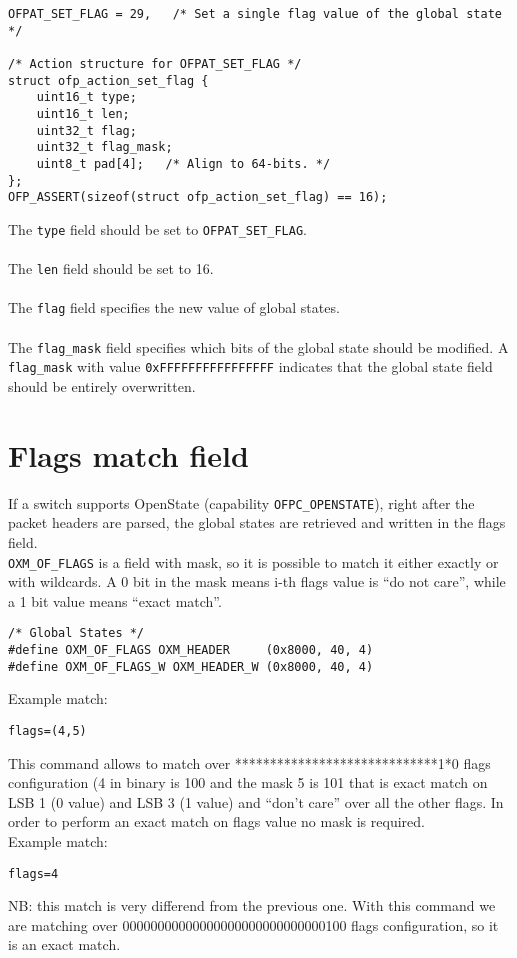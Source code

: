 \scriptsize\begin{verbatim}
OFPAT_SET_FLAG = 29,   /* Set a single flag value of the global state */

/* Action structure for OFPAT_SET_FLAG */
struct ofp_action_set_flag {
    uint16_t type;
    uint16_t len; 
    uint32_t flag;
    uint32_t flag_mask;   
    uint8_t pad[4];   /* Align to 64-bits. */
};
OFP_ASSERT(sizeof(struct ofp_action_set_flag) == 16);
\end{verbatim}\normalsize

\noindent
The \texttt{type} field should be set to \texttt{OFPAT\_SET\_FLAG}.
\\\\
The \texttt{len} field should be set to 16.
\\\\
The \texttt{flag} field specifies the new value of global states.
\\\\
The \texttt{flag\_mask} field specifies which bits of the global state should be modified. A \texttt{flag\_mask} with value \texttt{0xFFFFFFFFFFFFFFFF} indicates that the global state field should be entirely overwritten.

\section{Flags match field}
\label{section:oxm_of_flags}

If a switch supports OpenState (capability \texttt{OFPC\_OPENSTATE}), right after the packet headers are parsed, the global states are retrieved and written in the flags field. \\\texttt{OXM\_OF\_FLAGS} is a field with mask, so it is possible to match it either exactly or with wildcards. A 0 bit in the mask means i-th flags value is ``do not care'', while a 1 bit value means ``exact match''.

\scriptsize\begin{verbatim}
/* Global States */
#define OXM_OF_FLAGS OXM_HEADER     (0x8000, 40, 4)
#define OXM_OF_FLAGS_W OXM_HEADER_W (0x8000, 40, 4)
\end{verbatim}\normalsize
Example match:
\scriptsize\begin{verbatim}
flags=(4,5)
\end{verbatim}\normalsize
This command allows to match over *****************************1*0 flags configuration (4 in binary is 100 and the mask 5 is 101 that is exact match on LSB 1 (0 value) and LSB 3 (1 value) and ``don’t care'' over all the other flags. In order to perform an exact match on flags value no mask is required.
\\Example match:
\scriptsize\begin{verbatim}
flags=4
\end{verbatim}\normalsize
NB: this match is very differend from the previous one. With this command we are matching over 00000000000000000000000000000100 flags configuration, so it is an exact match.

